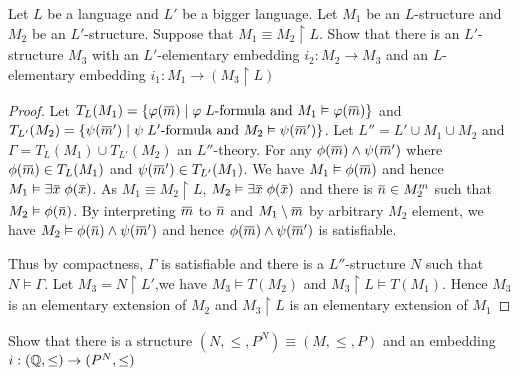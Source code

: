 \documentclass[11pt]{article}
\begin{document}
\begin{exercise}
Let \(L\) be a language and \(L'\) be a bigger language. Let \(M_1\) be an \(L\)-structure and \(M_2\)
be an \(L'\)-structure. Suppose that \(M_1\equiv M_2\upharpoonright L\). Show that there is
an \(L'\)-structure \(M_3\) with an \(L'\)-elementary embedding \(i_2:M_2\to M_3\) and an \(L\)-elementary
embedding \(i_1:M_1\to (M_3\upharpoonright L)\)
\end{exercise}

\begin{proof}
Let \(T_L(M_1)=\{\varphi(\barm)\mid\varphi\;L\text{-formula and }M_1\vDash\varphi(\barm)\}\)
and \(T_{L'}(M_2)=\{\psi(\barm')\mid\psi\;L'\text{-formula and }M_2\vDash\psi(\barm')\}\).
Let \(L''=L'\cup M_1\cup M_2\) and \(\Gamma =T_L(M_1)\cup T_{L'}(M_2)\) an \(L''\)-theory. For
any \(\phi(\barm)\wedge\psi(\barm')\) where \(\phi(\barm)\in T_L(M_1)\) and \(\psi(\barm')\in T_{L'}(M_1)\). We
have \(M_1\vDash\phi(\barm)\) and hence \(M_1\vDash\exists\barx\;\phi(\barx)\).
As \(M_1\equiv M_2\upharpoonright L\), \(M_2\vDash\exists\barx\;\phi(\barx)\) and there is \(\barn\in M_2^m\) such
that \(M_2\vDash\phi(\barn)\). By interpreting \(\barm\) to \(\barn\) and \(M_1\setminus\barm\) by arbitrary \(M_2\)
element, we have \(M_2\vDash\phi(\barn)\wedge\psi(\barm')\) and hence \(\phi(\barm)\wedge\psi(\barm')\) is satisfiable.

Thus by compactness, \(\Gamma\) is satisfiable and there is a \(L''\)-structure \(N\) such that \(N\vDash\Gamma\).
Let \(M_3=N\upharpoonright L'\),we have \(M_3\vDash T(M_2)\) and \(M_3\upharpoonright L\vDash T(M_1)\).
Hence \(M_3\) is an elementary extension of \(M_2\) and \(M_3\upharpoonright L\) is an elementary
extension of \(M_1\)
\end{proof}

\begin{exercise}
Show that there is a structure \((N,\le,P^N)\equiv(M,\le,P)\)  and an embedding \(i:(\mathbb{Q},\le)\to(P^N,\le)\)
\end{exercise}
\end{document}
